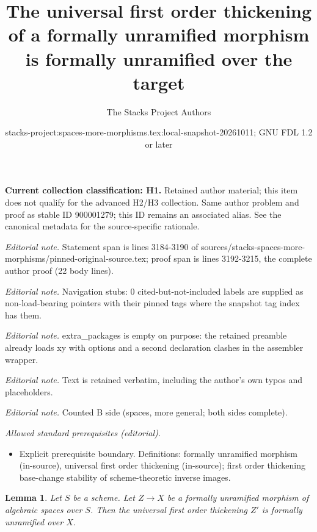\documentclass[10pt,a4paper]{amsart}
\title{The universal first order thickening of a formally unramified morphism is formally unramified over the target}
\author{The Stacks Project Authors}
\date{stacks-project:spaces-more-morphisms.tex:local-snapshot-20261011; GNU FDL 1.2 or later}
\theoremstyle{plain}
\newtheorem{lemma}[subsection]{Lemma}
\theoremstyle{definition}
\theoremstyle{remark}
\numberwithin{equation}{subsection}
\begin{document}
\maketitle
\par\medskip\noindent\textbf{Current collection classification: H1.} Retained author material; this item does not qualify for the advanced H2/H3 collection. Same author problem and proof as stable ID 900001279; this ID remains an associated alias. See the canonical metadata for the source-specific rationale.\par\medskip

\noindent\textit{Editorial note.} Statement span is lines 3184-3190 of sources/stacks-spaces-more-morphisms/pinned-original-source.tex; proof span is lines 3192-3215, the complete author proof (22 body lines).\par\medskip
\noindent\textit{Editorial note.} Navigation stubs: 0 cited-but-not-included labels are supplied as non-load-bearing pointers with their pinned tags where the snapshot tag index has them.\par\medskip
\noindent\textit{Editorial note.} extra\_packages is empty on purpose: the retained preamble already loads xy with options and a second declaration clashes in the assembler wrapper.\par\medskip
\noindent\textit{Editorial note.} Text is retained verbatim, including the author's own typos and placeholders.\par\medskip
\noindent\textit{Editorial note.} Counted B side (spaces, more general; both sides complete).\par\medskip
\noindent\textit{Allowed standard prerequisites (editorial).}\begin{itemize}
\item Explicit prerequisite boundary. Definitions: formally unramified morphism (in-source), universal first order thickening (in-source); first order thickening base-change stability of scheme-theoretic inverse images.
\end{itemize}\medskip
\begin{lemma}
\label{lemma-universal-thickening-unramified}
Let $S$ be a scheme.
Let $Z \to X$ be a formally unramified morphism of algebraic spaces over $S$.
Then the universal first order thickening $Z'$ is formally
unramified over $X$.
\end{lemma}
\end{document}
